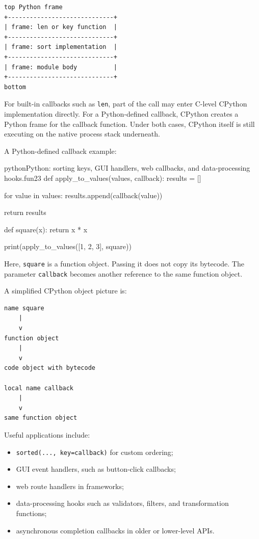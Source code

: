 \begin{verbatim}
top Python frame
+-----------------------------+
| frame: len or key function  |
+-----------------------------+
| frame: sort implementation  |
+-----------------------------+
| frame: module body          |
+-----------------------------+
bottom
\end{verbatim}

For built-in callbacks such as \texttt{len}, part of the call may enter C-level CPython implementation directly. For a Python-defined callback, CPython creates a Python frame for the callback function. Under both cases, CPython itself is still executing on the native process stack underneath.

A Python-defined callback example:

\begin{codebox}[]{python}{Python: sorting keys, GUI handlers, web callbacks, and data-processing hooks.}{fun23}
def apply_to_values(values, callback):
    results = []

    for value in values:
        results.append(callback(value))

    return results


def square(x):
    return x * x


print(apply_to_values([1, 2, 3], square))
\end{codebox}


Here, \texttt{square} is a function object. Passing it does not copy its bytecode. The parameter \texttt{callback} becomes another reference to the same function object.

A simplified CPython object picture is:

\begin{verbatim}
name square
    |
    v
function object
    |
    v
code object with bytecode

local name callback
    |
    v
same function object
\end{verbatim}

Useful applications include:

\begin{itemize}
    \item \texttt{sorted(..., key=callback)} for custom ordering;
    \item GUI event handlers, such as button-click callbacks;
    \item web route handlers in frameworks;
    \item data-processing hooks such as validators, filters, and transformation functions;
    \item asynchronous completion callbacks in older or lower-level APIs.
\end{itemize}

